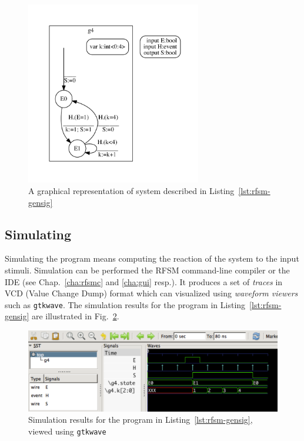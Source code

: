 \begin{figure}[h]
   \includegraphics[height=8cm]{figs/gensig-top}
   \centering
  \caption{A graphical representation of system described in Listing~\ref{lst:rfsm-gensig}}
  \label{fig:rfsm-gensig-top}
\end{figure}

\subsection*{Simulating}
\label{sec:simulating-1}

Simulating the program means computing the reaction of the system to the input stimuli. Simulation
can be performed the RFSM command-line compiler or the IDE (see Chap.~\ref{cha:rfsmc} and
\ref{cha:gui} resp.). It produces a set of
\emph{traces} in VCD (Value Change Dump) format which can visualized using \emph{waveform viewers}
such as \texttt{gtkwave}. The simulation results for the program in Listing~\ref{lst:rfsm-gensig}
are illustrated in Fig.~\ref{fig:rfsm-gensig-chrono}.

\begin{figure}[h]
   \includegraphics[width=\textwidth]{figs/gensig-chrono}
   \centering
  \caption{Simulation results for the program in Listing~\ref{lst:rfsm-gensig}, viewed using
    \texttt{gtkwave}}
  \label{fig:rfsm-gensig-chrono}
\end{figure}

